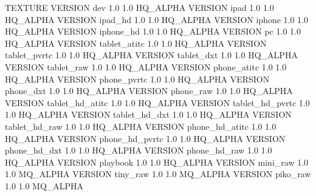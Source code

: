 TEXTURE
{
	VERSION dev			1.0 1.0		HQ_ALPHA
	VERSION ipad		1.0 1.0 	HQ_ALPHA
	VERSION ipad_hd		1.0 1.0 	HQ_ALPHA
	VERSION iphone 		1.0 1.0 	HQ_ALPHA
	VERSION iphone_hd	1.0 1.0		HQ_ALPHA
	VERSION pc 			1.0 1.0 	HQ_ALPHA
	VERSION tablet_atitc	1.0	1.0	HQ_ALPHA
	VERSION tablet_pvrtc	1.0	1.0	HQ_ALPHA
	VERSION tablet_dxt		1.0	1.0	HQ_ALPHA
	VERSION tablet_raw		1.0	1.0	HQ_ALPHA
	VERSION phone_atitc		1.0	1.0	HQ_ALPHA
	VERSION phone_pvrtc		1.0	1.0	HQ_ALPHA
	VERSION phone_dxt		1.0	1.0	HQ_ALPHA
	VERSION phone_raw		1.0	1.0	HQ_ALPHA
	VERSION tablet_hd_atitc	1.0	1.0	HQ_ALPHA
	VERSION tablet_hd_pvrtc	1.0	1.0	HQ_ALPHA
	VERSION tablet_hd_dxt	1.0	1.0	HQ_ALPHA
	VERSION tablet_hd_raw	1.0	1.0	HQ_ALPHA
	VERSION phone_hd_atitc	1.0	1.0	HQ_ALPHA
	VERSION phone_hd_pvrtc	1.0	1.0	HQ_ALPHA
	VERSION phone_hd_dxt	1.0	1.0	HQ_ALPHA
	VERSION phone_hd_raw	1.0	1.0	HQ_ALPHA
	VERSION playbook	1.0 1.0 	HQ_ALPHA
	VERSION mini_raw		1.0 1.0 	MQ_ALPHA
	VERSION tiny_raw		1.0 1.0 	MQ_ALPHA
	VERSION piko_raw		1.0 1.0 	MQ_ALPHA
}
